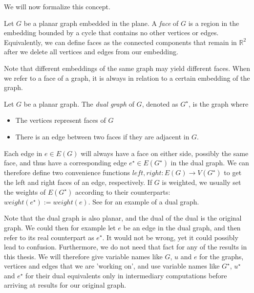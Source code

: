 We will now formalize this concept.

\begin{definition}[Face]
    Let $G$ be a planar graph embedded in the plane. A \emph{face} of $G$ is a region in the embedding bounded by a cycle that contains no other vertices or edges. Equivalently, we can define faces as the connected components that remain in $\mathbb{R}^2$ after we delete all vertices and edges from our embedding. 

    Note that different embeddings of the same graph may yield different faces. When we refer to a face of a graph, it is always in relation to a certain embedding of the graph.
\end{definition}

\begin{definition}
    Let $G$ be a planar graph. The \emph{dual graph} of $G$, denoted as $G^\star$, is the graph where 
    \begin{itemize}
        \item The vertices represent faces of $G$
        \item There is an edge between two faces if they are adjacent in $G$.
    \end{itemize}
\end{definition}

Each edge in $e \in E(G)$ will always have a face on either side, possibly the same face, and thus have a corresponding edge $e^\star \in E(G^\star)$ in the dual graph. We can therefore define two convenience functions $left, right : E(G) \rightarrow V(G^\star)$ to get the left and right faces of an edge, respectively. If $G$ is weighted, we usually set the weights of $E(G^\star)$ according to their counterparts: $weight(e^\star) := weight(e)$. See  for an example of a dual graph.

Note that the dual graph is also planar, and the dual of the dual is the original graph. We could then for example let $e$ be an edge in the dual graph, and then refer to its real counterpart as $e^\star$. It would not be wrong, yet it could possibly lead to confusion. Furthermore, we do not need that fact for any of the results in this thesis. We will therefore give variable names like $G$, $u$ and $e$ for the graphs, vertices and edges that we are 'working on', and use variable names like $G^\star$, $u^\star$ and $e^\star$ for their dual equivalents only in intermediary computations before arriving at results for our original graph.

